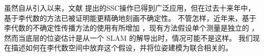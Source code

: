 虽然自从引入以来，文献 \cite{smith1990a} 提出的SSC操作已得到广泛应用，但在过去十来年中，基于李代数的方法已被证明能更精确地刻画不确定性。
不管怎样，近年来，基于李代数的不确定性传播方法的使用有所增加 \cite{forster2017manifold, rhartley-2018a, wheeler2018relative}，现有方法假设单个测量是独立的 \cite{barfoot2014associating}，然而当底层的位姿估计是从一个 \ac{SLAM} 的解导出时，情况可能不是这样。 
我们现在描述如何在李代数空间中放弃这个假设，并将位姿建模为联合相关的。 





